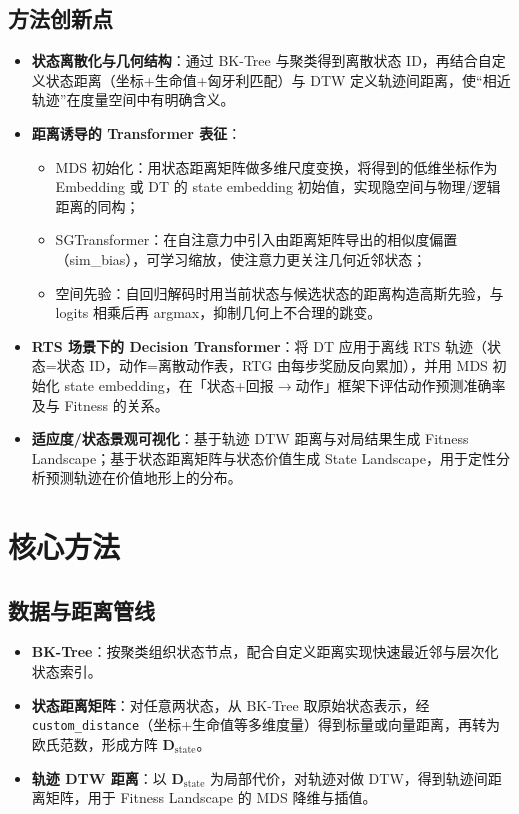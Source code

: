 \documentclass[UTF8,11pt]{ctexart}
\begin{document}
\subsection{方法创新点}
\begin{itemize}[leftmargin=*]
    \item \textbf{状态离散化与几何结构}：通过 BK-Tree 与聚类得到离散状态 ID，再结合自定义状态距离（坐标+生命值+匈牙利匹配）与 DTW 定义轨迹间距离，使“相近轨迹”在度量空间中有明确含义。
    \item \textbf{距离诱导的 Transformer 表征}：
    \begin{itemize}
        \item MDS 初始化：用状态距离矩阵做多维尺度变换，将得到的低维坐标作为 Embedding 或 DT 的 state embedding 初始值，实现隐空间与物理/逻辑距离的同构；
        \item SGTransformer：在自注意力中引入由距离矩阵导出的相似度偏置（sim\_bias），可学习缩放，使注意力更关注几何近邻状态；
        \item 空间先验：自回归解码时用当前状态与候选状态的距离构造高斯先验，与 logits 相乘后再 argmax，抑制几何上不合理的跳变。
    \end{itemize}
    \item \textbf{RTS 场景下的 Decision Transformer}：将 DT 应用于离线 RTS 轨迹（状态=状态 ID，动作=离散动作表，RTG 由每步奖励反向累加），并用 MDS 初始化 state embedding，在「状态+回报$\to$动作」框架下评估动作预测准确率及与 Fitness 的关系。
    \item \textbf{适应度/状态景观可视化}：基于轨迹 DTW 距离与对局结果生成 Fitness Landscape；基于状态距离矩阵与状态价值生成 State Landscape，用于定性分析预测轨迹在价值地形上的分布。
\end{itemize}

\vspace{0.5em}

\section{核心方法}
\label{sec:methods}

\subsection{数据与距离管线}
\begin{itemize}[leftmargin=*]
    \item \textbf{BK-Tree}：按聚类组织状态节点，配合自定义距离实现快速最近邻与层次化状态索引。
    \item \textbf{状态距离矩阵}：对任意两状态，从 BK-Tree 取原始状态表示，经 \texttt{custom\_distance}（坐标+生命值等多维度量）得到标量或向量距离，再转为欧氏范数，形成方阵 $\mathbf{D}_{\mathrm{state}}$。
    \item \textbf{轨迹 DTW 距离}：以 $\mathbf{D}_{\mathrm{state}}$ 为局部代价，对轨迹对做 DTW，得到轨迹间距离矩阵，用于 Fitness Landscape 的 MDS 降维与插值。
\end{itemize}
\end{document}
